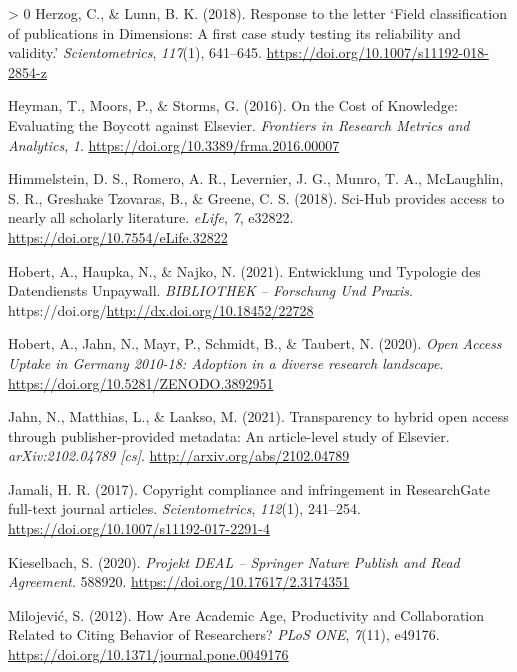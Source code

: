 \documentclass[
]{article}
\newlength{\cslhangindent}
\newenvironment{CSLReferences}[3] %
 {%
  \setlength{\parindent}{0pt}
  \ifodd #1 \everypar{\setlength{\hangindent}{\cslhangindent}}\ignorespaces\fi
  \ifnum #2 > 0
  \setlength{\parskip}{#3\baselineskip}
  \fi
 }%
 {}
\begin{document}
\begin{CSLReferences}{1}{0}
\leavevmode\hypertarget{ref-herzog_response_2018}{}%
Herzog, C., \& Lunn, B. K. (2018). Response to the letter {`{Field} classification of publications in {Dimensions}: A first case study testing its reliability and validity.'} \emph{Scientometrics}, \emph{117}(1), 641--645. \url{https://doi.org/10.1007/s11192-018-2854-z}

\leavevmode\hypertarget{ref-heyman_cost_2016}{}%
Heyman, T., Moors, P., \& Storms, G. (2016). On the {Cost} of {Knowledge}: {Evaluating} the {Boycott} against {Elsevier}. \emph{Frontiers in Research Metrics and Analytics}, \emph{1}. \url{https://doi.org/10.3389/frma.2016.00007}

\leavevmode\hypertarget{ref-himmelstein_sci-hub_2018}{}%
Himmelstein, D. S., Romero, A. R., Levernier, J. G., Munro, T. A., McLaughlin, S. R., Greshake Tzovaras, B., \& Greene, C. S. (2018). Sci-{Hub} provides access to nearly all scholarly literature. \emph{eLife}, \emph{7}, e32822. \url{https://doi.org/10.7554/eLife.32822}

\leavevmode\hypertarget{ref-hobert_entwicklung_2021}{}%
Hobert, A., Haupka, N., \& Najko, N. (2021). Entwicklung und {Typologie} des {Datendiensts} {Unpaywall}. \emph{BIBLIOTHEK -- Forschung Und Praxis}. https://doi.org/\url{http://dx.doi.org/10.18452/22728}

\leavevmode\hypertarget{ref-hobert_anne_open_2020}{}%
Hobert, A., Jahn, N., Mayr, P., Schmidt, B., \& Taubert, N. (2020). \emph{Open {Access} {Uptake} in {Germany} 2010-18: {Adoption} in a diverse research landscape}. \url{https://doi.org/10.5281/ZENODO.3892951}

\leavevmode\hypertarget{ref-jahn_transparency_2021}{}%
Jahn, N., Matthias, L., \& Laakso, M. (2021). Transparency to hybrid open access through publisher-provided metadata: {An} article-level study of {Elsevier}. \emph{arXiv:2102.04789 {[}cs{]}}. \url{http://arxiv.org/abs/2102.04789}

\leavevmode\hypertarget{ref-jamali_copyright_2017}{}%
Jamali, H. R. (2017). Copyright compliance and infringement in {ResearchGate} full-text journal articles. \emph{Scientometrics}, \emph{112}(1), 241--254. \url{https://doi.org/10.1007/s11192-017-2291-4}

\leavevmode\hypertarget{ref-kieselbach_projekt_2020}{}%
Kieselbach, S. (2020). \emph{Projekt {DEAL} -- {Springer} {Nature} {Publish} and {Read} {Agreement}}. 588920. \url{https://doi.org/10.17617/2.3174351}

\leavevmode\hypertarget{ref-milojevic_how_2012}{}%
Milojević, S. (2012). How {Are} {Academic} {Age}, {Productivity} and {Collaboration} {Related} to {Citing} {Behavior} of {Researchers}? \emph{PLoS ONE}, \emph{7}(11), e49176. \url{https://doi.org/10.1371/journal.pone.0049176}


\end{CSLReferences}
\end{document}
